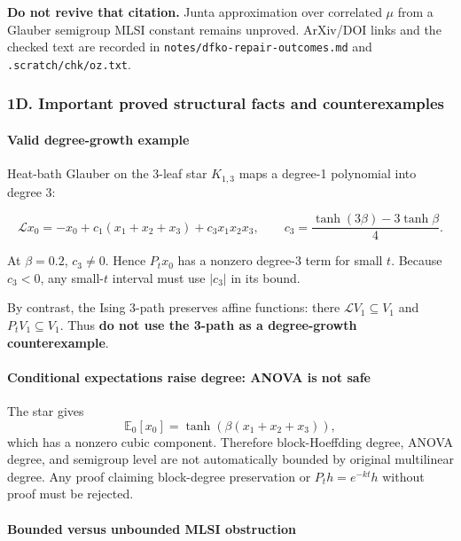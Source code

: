 \textbf{Do not revive that citation.} Junta approximation over correlated \(\mu\) from a Glauber semigroup MLSI constant remains unproved. ArXiv/DOI links and the checked text are recorded in \texttt{notes/dfko-repair-outcomes.md} and \texttt{.scratch/chk/oz.txt}.

\subsubsection{1D. Important proved structural facts and counterexamples}\label{d.-important-proved-structural-facts-and-counterexamples}

\paragraph{Valid degree-growth example}\label{valid-degree-growth-example}

Heat-bath Glauber on the 3-leaf star \(K_{1,3}\) maps a degree-1 polynomial into degree 3:

\[\mathcal Lx_0=-x_0+c_1(x_1+x_2+x_3)
+c_3x_1x_2x_3,\qquad
c_3=\frac{\tanh(3\beta)-3\tanh\beta}{4}.\]

At \(\beta=0.2\), \(c_3\neq0\). Hence \(P_tx_0\) has a nonzero degree-3 term for small \(t\). Because \(c_3<0\), any small-\(t\) interval must use \(|c_3|\) in its bound.

By contrast, the Ising 3-path preserves affine functions: there \(\mathcal L V_1\subseteq V_1\) and \(P_tV_1\subseteq V_1\). Thus \textbf{do not use the 3-path as a degree-growth counterexample}.

\paragraph{Conditional expectations raise degree: ANOVA is not safe}\label{conditional-expectations-raise-degree-anova-is-not-safe}

The star gives
\[\mathbb E_0[x_0]=\tanh(\beta(x_1+x_2+x_3)),\]
which has a nonzero cubic component. Therefore block-Hoeffding degree, ANOVA degree, and semigroup level are not automatically bounded by original multilinear degree. Any proof claiming block-degree preservation or \(P_t h=e^{-kt}h\) without proof must be rejected.

\paragraph{Bounded versus unbounded MLSI obstruction}\label{bounded-versus-unbounded-mlsi-obstruction}

